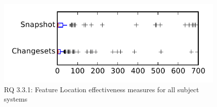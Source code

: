
\begin{figure}
\centering
\includegraphics[height=0.4\textheight]{figures/flt_seed/rq1_tiny}
\caption{RQ 3.3.1: Feature Location effectiveness measures for all subject systems}
\label{fig:flt_seed:rq1:tiny}
\end{figure}
